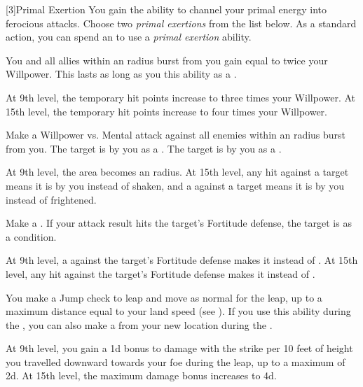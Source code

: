         [3]{Primal Exertion}
        You gain the ability to channel your primal energy into ferocious attacks.
        Choose two \textit{primal exertions} from the list below.
        As a standard action, you can spend an  to use a \textit{primal exertion} ability.
        {
             You and all allies within an \arealarge radius burst from you gain  equal to twice your Willpower.
            This lasts as long as you  this ability as a .

            At 9th level, the temporary hit points increase to three times your Willpower.
            At 15th level, the temporary hit points increase to four times your Willpower.

            Make a Willpower vs. Mental attack against all enemies within an \areamed radius burst from you.
             The target is \shaken by you as a .
             The target is \frightened by you as a .

            At 9th level, the area becomes an \arealarge radius.
            At 15th level, any hit against a target means it is \frightened by you instead of shaken, and a  against a target means it is \panicked by you instead of frightened.

             Make a .
            If your attack result hits the target's Fortitude defense, the target is \sickened as a condition.

            At 9th level, a  against the target's Fortitude defense makes it \nauseated instead of \sickened.
            At 15th level, any hit against the target's Fortitude defense makes it \nauseated instead of \sickened.

             You make a Jump check to leap and move as normal for the leap, up to a maximum distance equal to your land speed (see ).
            If you use this ability during the , you can also make a  from your new location during the .

            At 9th level, you gain a \plus1d bonus to damage with the strike per 10 feet of height you travelled downward towards your foe during the leap, up to a maximum of \plus2d.
            At 15th level, the maximum damage bonus increases to \plus4d.

}
